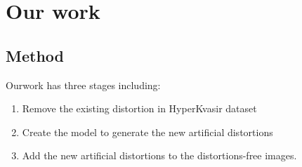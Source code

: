 \documentclass{libs/ufc_format}
\begin{document}
\section{Our work}
\subsection{Method}
\begin{frame}{Ourwork}
     has three stages including:
    \begin{enumerate}
        \item Remove the existing distortion in HyperKvasir dataset
        \item Create the model to generate the new artificial distortions
        \item Add the new artificial distortions to the distortions-free images.
    \end{enumerate}









\end{frame}
\end{document}
